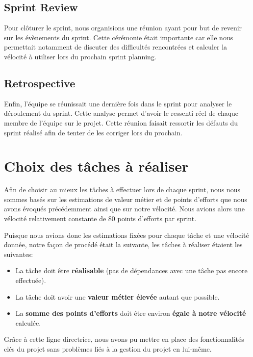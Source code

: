 \documentclass[11pt]{report}
\begin{document}
\subsection{Sprint Review}

Pour clôturer le sprint, nous organisions une réunion ayant pour but de revenir sur les évènements du sprint.
Cette cérémonie était importante car elle nous permettait notamment de discuter des difficultés rencontrées et calculer la vélocité 
à utiliser lors du prochain sprint planning.

\subsection{Retrospective}

Enfin, l'équipe se réunissait une dernière fois dans le sprint pour analyser le déroulement du sprint. Cette analyse permet d'avoir le ressenti réel de chaque membre de l'équipe sur le projet. Cette réunion faisait ressortir les défauts du sprint réalisé afin de tenter de les corriger lors du prochain.

\section{Choix des tâches à réaliser}

Afin de choisir au mieux les tâches à effectuer lors de chaque sprint, nous nous sommes basés sur les estimations de valeur métier et de points d'efforts que nous avons évoqués précédemment ainsi que sur notre vélocité. Nous avions alors une vélocité relativement constante de 80 points d'efforts par sprint.\newline

Puisque nous avions donc les estimations fixées pour chaque tâche et une vélocité donnée, notre façon de procédé était la suivante, les tâches à réaliser étaient les suivantes:
\begin{itemize}
  \item La tâche doit être \textbf{réalisable} (pas de dépendances avec une tâche pas encore effectuée).
  \item La tâche doit avoir une \textbf{valeur métier élevée} autant que possible.
  \item La \textbf{somme des points d'efforts} doit être environ \textbf{égale à notre vélocité} calculée.\newline
\end{itemize}

Grâce à cette ligne directrice, nous avons pu mettre en place des fonctionnalités clés du projet sans problèmes liés à la gestion du projet en lui-même.
\end{document}
